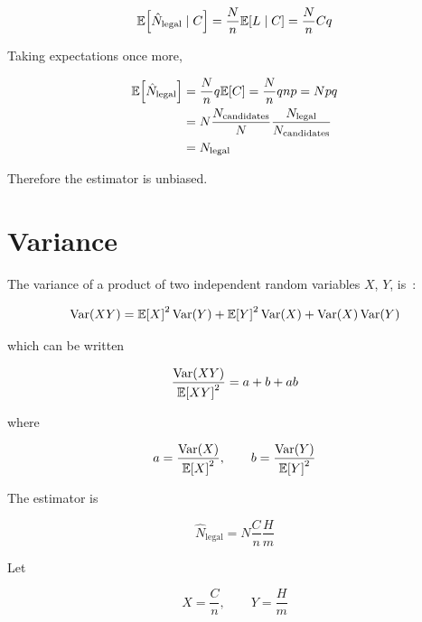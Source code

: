 \documentclass[a4paper,10pt]{article}
\DeclareMathOperator{\Var}{Var}
\DeclarePairedDelimiter\bracket{[}{]}
\newcommand{\E}[1]{\mathbb{E}\bracket*{#1}}
\begin{document}
\begin{equation}
  \E{\hat{N}_{\text{legal}} \mid C} = \frac{N}{n} \E{L \mid C} = \frac{N}{n} Cq
\end{equation}

Taking expectations once more,

\begin{align}
  \E{\hat{N}_{\text{legal}}} &= \frac{N}{n} q \E{C} = \frac{N}{n} qnp = Npq              \\
    &= N \frac{N_{\text{candidates}}}{N} \frac{N_{\text{legal}}}{N_{\text{candidates}}}  \\
    &= N_{\text{legal}} \label{eq:unbiased}
\end{align}

Therefore the estimator is unbiased.

\section*{Variance}

The variance of a product of two independent random variables $X$, $Y$,
is~\cite{wiki:productvariance}:

\begin{equation}
  \Var(XY) = \E{X}^2\Var(Y) + \E{Y}^2\Var(X) + \Var(X)\Var(Y)
\end{equation}

which can be written

\begin{equation}
  \label{eq:rel.var}
  \frac{\Var(XY)}{\E{XY}^2} = a + b + ab
\end{equation}

where

\begin{equation}
  \label{eq:rel.ab}
  a = \frac{\Var(X)}{\E{X}^2}, \qquad b = \frac{\Var(Y)}{\E{Y}^2}
\end{equation}

The estimator is

\begin{equation}
  \label{eq:nhat}
  \hat{N}_{\text{legal}} = N \frac{C}{n} \frac{H}{m}
\end{equation}

Let

\begin{equation}
  X = \frac{C}{n}, \qquad Y = \frac{H}{m} \label{eq:xy}
\end{equation}
\end{document}
